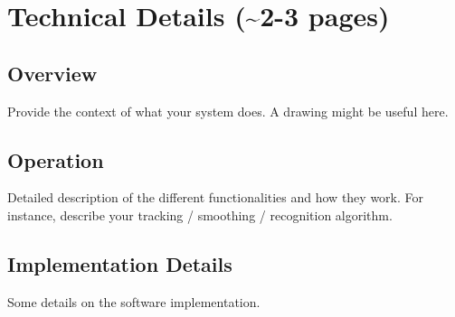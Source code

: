 \section{Technical Details (\textasciitilde 2-3 pages)}
\label{sec:technical}

\subsection{Overview}
\label{sec:overview}

Provide the context of what your system does. A drawing might be useful here.

\subsection{Operation}
\label{sec:operation}

Detailed description of the different functionalities and how they work. For
instance, describe your tracking / smoothing / recognition algorithm.

\subsection{Implementation Details}
\label{sec:implementation}

Some details on the software implementation.
